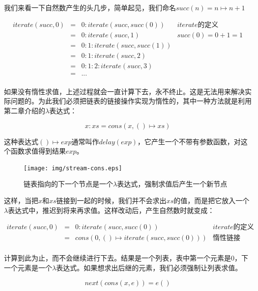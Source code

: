 \documentclass{article}
\begin{document}
我们来看一下自然数产生的头几步，简单起见，我们命名$succ(n) = n \mapsto n +1$

\[
\begin{array}{rcll}
iterate(succ, 0) & = & 0 : iterate(succ, succ(0)) & iterate\text{的定义}\\
                 & = & 0 : iterate(succ, 1) & succ(0) = 0 + 1 = 1 \\
                 & = & 0 : 1 : iterate(succ, succ(1)) & \\
                 & = & 0 : 1 : iterate(succ, 2) & \\
                 & = & 0 : 1 : 2 : iterate(succ, 3) & \\
                 & = & ... & \\
\end{array}
\]

如果没有惰性求值，上述过程就会一直计算下去，永不终止。这是无法用来解决实际问题的。为此我们必须把链表的链接操作实现为惰性的，其中一种方法就是利用第二章介绍的$\lambda$表达式：

\[
x : xs = cons(x, () \mapsto xs)
\]

这种表达式$() \mapsto exp$通常叫作$delay(exp)$，它产生一个不带有参数函数，对这个函数求值得到结果$exp$。

\begin{figure}[htbp]
 \centering
 \texttt{[image: img/stream-cons.eps]}
 \caption{链表指向的下一个节点是一个$\lambda$表达式，强制求值后产生一个新节点}
 \label{fig:stream-cons}
\end{figure}

这样，当把$x$和$xs$链接到一起的时候，我们并不会求出$xs$的值，而是把它放入一个$\lambda$表达式中，推迟到将来再求值。这样改动后，产生自然数时就变成：

\[
\begin{array}{rcll}
iterate(succ, 0) & = & 0 : iterate(succ, succ(0)) & iterate\text{的定义}\\
                 & = & cons(0, () \mapsto iterate(succ, succ(0))) & \text{惰性链接} \\
\end{array}
\]

计算到此为止，而不会继续进行下去。结果是一个列表，表中第一个元素是0，下一个元素是一个$\lambda$表达式。如果想求出后继的元素，我们必须强制让列表求值。

\[
next(cons(x, e)) = e()
\]
\end{document}
